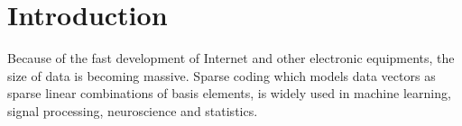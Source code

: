 \section{Introduction}
\label{sec:Introduction}
Because of the fast development of Internet and other electronic equipments, the size of data is becoming  massive.
Sparse coding which models data vectors as sparse linear combinations of basis elements, is widely used in machine learning, signal processing, neuroscience and statistics.
